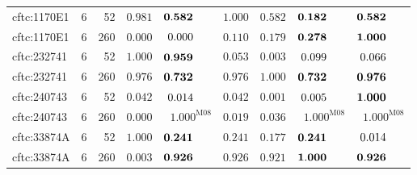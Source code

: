 \documentclass[10pt,a4paper]{article}
\begin{document}
\begin{longtable}{@{}lrrrrrrrr@{}}
cftc:1170E1 & 6 & 52 & $\mathbf{0.981}$ & $\mathbf{0.582}\hphantom{^{\mathrm{M00}}}$ & $\mathbf{1.000}$ & $\mathbf{0.582}$ & $\mathbf{0.182}\hphantom{^{\mathrm{M00}}}$ & $\mathbf{0.582}\hphantom{^{\mathrm{M00}}}$ \\
cftc:1170E1 & 6 & 260 & $0.000$ & $0.000\hphantom{^{\mathrm{M00}}}$ & $\mathbf{0.110}$ & $\mathbf{0.179}$ & $\mathbf{0.278}\hphantom{^{\mathrm{M00}}}$ & $\mathbf{1.000}\hphantom{^{\mathrm{M00}}}$ \\
cftc:232741 & 6 & 52 & $\mathbf{1.000}$ & $\mathbf{0.959}\hphantom{^{\mathrm{M00}}}$ & $0.053$ & $0.003$ & $0.099\hphantom{^{\mathrm{M00}}}$ & $0.066\hphantom{^{\mathrm{M00}}}$ \\
cftc:232741 & 6 & 260 & $\mathbf{0.976}$ & $\mathbf{0.732}\hphantom{^{\mathrm{M00}}}$ & $\mathbf{0.976}$ & $\mathbf{1.000}$ & $\mathbf{0.732}\hphantom{^{\mathrm{M00}}}$ & $\mathbf{0.976}\hphantom{^{\mathrm{M00}}}$ \\
cftc:240743 & 6 & 52 & $0.042$ & $0.014\hphantom{^{\mathrm{M00}}}$ & $0.042$ & $0.001$ & $0.005\hphantom{^{\mathrm{M00}}}$ & $\mathbf{1.000}\hphantom{^{\mathrm{M00}}}$ \\
cftc:240743 & 6 & 260 & $0.000$ & $\mathbf{1.000}^{\mathrm{M08}}$ & $0.019$ & $0.036$ & $\mathbf{1.000}^{\mathrm{M08}}$ & $\mathbf{1.000}^{\mathrm{M08}}$ \\
cftc:33874A & 6 & 52 & $\mathbf{1.000}$ & $\mathbf{0.241}\hphantom{^{\mathrm{M00}}}$ & $\mathbf{0.241}$ & $\mathbf{0.177}$ & $\mathbf{0.241}\hphantom{^{\mathrm{M00}}}$ & $0.014\hphantom{^{\mathrm{M00}}}$ \\
cftc:33874A & 6 & 260 & $0.003$ & $\mathbf{0.926}\hphantom{^{\mathrm{M00}}}$ & $\mathbf{0.926}$ & $\mathbf{0.921}$ & $\mathbf{1.000}\hphantom{^{\mathrm{M00}}}$ & $\mathbf{0.926}\hphantom{^{\mathrm{M00}}}$ \\
\end{longtable}
\end{document}
